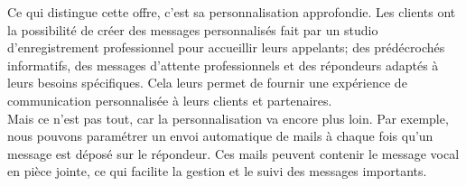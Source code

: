 \documentclass[12pt, a4paper]{article}
\begin{document}
Ce qui distingue cette offre, c'est sa
personnalisation approfondie. Les clients ont
la possibilité de créer des messages personnalisés 
fait par un studio d'enregistrement professionnel 
pour accueillir leurs appelants; des prédécrochés
informatifs, des messages d'attente professionnels
et des répondeurs adaptés à leurs besoins spécifiques.
Cela leurs permet de fournir une expérience de
communication personnalisée à leurs clients
et partenaires.\\

Mais ce n'est pas tout, car la personnalisation
va encore plus loin. Par exemple, nous
pouvons paramétrer un envoi automatique de
mails à chaque fois qu'un message est déposé sur
le répondeur. Ces mails peuvent contenir le
message vocal en pièce jointe, ce qui
facilite la gestion et le suivi des messages importants.\\
\end{document}
